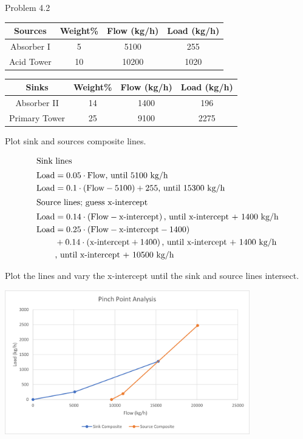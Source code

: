 \item Problem 4.2

\begin{center}
    \begin{tabular}{|c|c|c|c|}
        \hline
        Sources & Weight\% & Flow (kg/h) & Load (kg/h) \\
        \hline
        Absorber I & 5 & 5100 & 255 \\
        Acid Tower & 10 & 10200 & 1020 \\
        \hline
    \end{tabular} 
    
    \begin{tabular}{|c|c|c|c|}
        \hline
        Sinks & Weight\% & Flow (kg/h) & Load (kg/h) \\
        \hline
        Absorber II & 14 & 1400 & 196 \\
        Primary Tower & 25 & 9100 & 2275 \\
        \hline
    \end{tabular} 
\end{center}

Plot sink and sources composite lines.

\begin{align*}
    \intertext{Sink lines}
    \text{Load} &= 0.05 \cdot \text{Flow} \text{, until 5100 kg/h} \\
    \text{Load} &= 0.1 \cdot \left(\text{Flow} - 5100\right) + 255 \text{, until 15300 kg/h} \\
    \intertext{Source lines; guess x-intercept}
    \text{Load} &= 0.14 \cdot \left(\text{Flow} - \text{x-intercept}\right) \text{, until x-intercept + 1400 kg/h} \\
    \text{Load} &= 0.25 \cdot \left(\text{Flow} - \text{x-intercept} - 1400\right) \\ 
    & + 0.14 \cdot \left(\text{x-intercept} + 1400\right) \text{, until x-intercept + 1400 kg/h} \\ 
    & \text{, until x-intercept + 10500 kg/h} \\
\end{align*}

Plot the lines and vary the x-intercept until the sink and source lines intersect.

\begin{center}
    \includegraphics[width=0.8\textwidth]{assets/p2.png}
\end{center}

